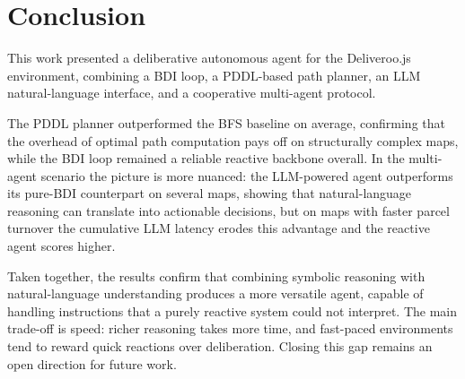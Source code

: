 \section{Conclusion}\label{sec:conclusion}

This work presented a deliberative autonomous agent for the Deliveroo.js environment, combining a BDI loop, a PDDL-based path planner, an LLM natural-language interface, and a cooperative multi-agent protocol.

The PDDL planner outperformed the BFS baseline on average, confirming that the overhead of optimal path computation pays off on structurally complex maps, while the BDI loop remained a reliable reactive backbone overall. In the multi-agent scenario the picture is more nuanced: the LLM-powered agent outperforms its pure-BDI counterpart on several maps, showing that natural-language reasoning can translate into actionable decisions, but on maps with faster parcel turnover the cumulative LLM latency erodes this advantage and the reactive agent scores higher.

Taken together, the results confirm that combining symbolic reasoning with natural-language understanding produces a more versatile agent, capable of handling instructions that a purely reactive system could not interpret. The main trade-off is speed: richer reasoning takes more time, and fast-paced environments tend to reward quick reactions over deliberation. Closing this gap remains an open direction for future work.

